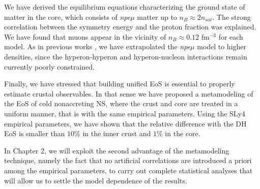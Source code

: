 We have derived the equilibrium equations characterizing the ground state of
matter in the core, which consists of \textit{npe$\mu$} matter up to $n_B
\approx 2n_{sat}$. The strong correlation between the symmetry energy and the 
proton fraction was explained. We have found that muons appear in the vicinity 
of $n_B \approx 0.12$ fm$^{-3}$ for each model. As in previous works
\cite{Wiringa1988,Douchin2001}, we have extrapolated the \textit{npe$\mu$} 
model to higher densities, since the hyperon-hyperon and hyperon-nucleon 
interactions remain currently poorly constrained.

Finally, we have stressed that building unified EoS is essential to properly
estimate crustal observables. In that sense we have proposed a metamodeling of 
the EoS of cold nonaccreting NS, where the crust and core are treated in a
uniform manner, that is with the same empirical parameters. Using the SLy4
empirical parameters, we have shown that the relative difference with the DH 
EoS is smaller than $10\%$ in the inner crust and $1\%$ in the core. 

{In Chapter 2, we will exploit the second advantage of the metamodeling
technique, namely the fact that no artificial correlations are introduced a
priori among the empirical parameters, to carry out complete statistical
analyses that will allow us to settle the model dependence of the results.}

\clearpage\thispagestyle{empty}
